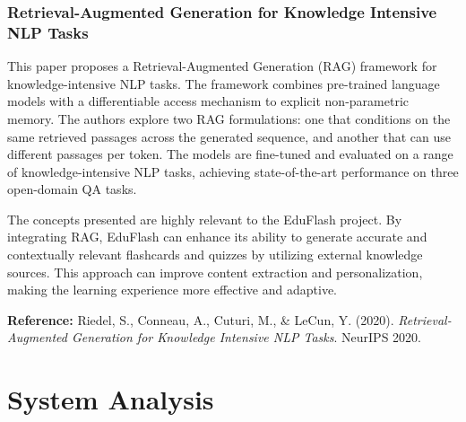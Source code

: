 \documentclass{report}
\begin{document}
\subsection{Retrieval-Augmented Generation for Knowledge Intensive NLP Tasks}
This paper proposes a Retrieval-Augmented Generation (RAG) framework for knowledge-intensive NLP tasks. The framework combines pre-trained language models with a differentiable access mechanism to explicit non-parametric memory. The authors explore two RAG formulations: one that conditions on the same retrieved passages across the generated sequence, and another that can use different passages per token. The models are fine-tuned and evaluated on a range of knowledge-intensive NLP tasks, achieving state-of-the-art performance on three open-domain QA tasks.

The concepts presented are highly relevant to the EduFlash project. By integrating RAG, EduFlash can enhance its ability to generate accurate and contextually relevant flashcards and quizzes by utilizing external knowledge sources. This approach can improve content extraction and personalization, making the learning experience more effective and adaptive.

\textbf{Reference:} Riedel, S., Conneau, A., Cuturi, M., \& LeCun, Y. (2020). \textit{Retrieval-Augmented Generation for Knowledge Intensive NLP Tasks}. NeurIPS 2020.




\chapter{System Analysis}
\end{document}
